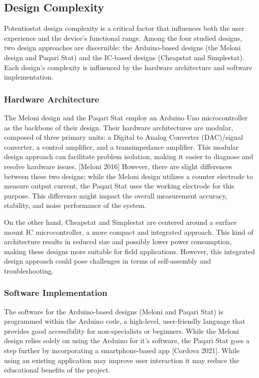 \documentclass{article}
\begin{document}
\subsection*{Design Complexity}
Potentiostat design complexity is a critical factor that influences both the user experience and the device's functional range. Among the four studied designs, two design approaches are discernible: the Arduino-based designs (the Meloni design and Paqari Stat) and the IC-based designs (Cheapstat and Simplestat). Each design's complexity is influenced by the hardware architecture and software implementation.

\subsubsection*{Hardware Architecture}
The Meloni design and the Paqari Stat employ an Arduino Uno microcontroller as the backbone of their design. Their hardware architectures are modular, composed of three primary units: a Digital to Analog Converter (DAC)/signal converter, a control amplifier, and a transimpedance amplifier. This modular design approach can facilitate problem isolation, making it easier to diagnose and resolve hardware issues. [Meloni 2016] However, there are slight differences between these two designs; while the Meloni design utilizes a counter electrode to measure output current, the Paqari Stat uses the working electrode for this purpose. This difference might impact the overall measurement accuracy, stability, and noise performance of the system. 

On the other hand, Cheapstat and Simplestat are centered around a surface mount IC microcontroller, a more compact and integrated approach. This kind of architecture results in reduced size and possibly lower power consumption, making these designs more suitable for field applications. However, this integrated design approach could pose challenges in terms of self-assembly and troubleshooting.

\subsubsection*{Software Implementation}
The software for the Arduino-based designs (Meloni and Paqari Stat) is programmed within the Arduino code, a high-level, user-friendly language that provides good accessibility for non-specialists or beginners. While the Meloni design relies solely on using the Arduino for it's software, the Paqari Stat goes a step further by incorporating a smartphone-based app [Cordova 2021]. While using an existing application may improve user interaction it may reduce the educational benefits of the project.
\end{document}
